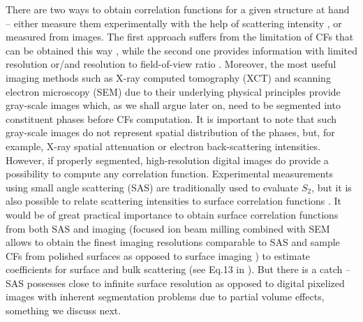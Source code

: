 \documentclass[reprint,amsmath,amssymb,aps,pre,showkeys,showpacs]{revtex4-1}
\begin{document}
There are two ways to obtain correlation functions for a given structure at hand
-- either measure them experimentally with the help of scattering intensity
\cite{debye1957scattering,li2018accurate}, or measured from images. The first
approach suffers from the limitation of CFs that can be obtained this way
\cite{Gommes_notchord}, while the second one provides information with limited
resolution or/and resolution to field-of-view ratio \cite{SciRep1}. Moreover,
the most useful imaging methods such as X-ray computed tomography (XCT) and
scanning electron microscopy (SEM) due to their underlying physical principles
provide gray-scale images which, as we shall argue later on, need to be
segmented into constituent phases before CFs computation. It is important to
note that such gray-scale images do not represent spatial distribution of the
phases, but, for example, X-ray spatial attenuation or electron back-scattering
intensities. However, if properly segmented, high-resolution digital images do
provide a possibility to compute any correlation function. Experimental
measurements using small angle scattering (SAS) are traditionally used to
evaluate $S_2$, but it is also possible to relate scattering intensities to
surface correlation functions \cite{dietrich1995scattering,ma2018SS}. It would
be of great practical importance to obtain surface correlation functions from
both SAS and imaging (focused ion beam milling combined with SEM allows to
obtain the finest imaging resolutions comparable to SAS and sample CFs from
polished surfaces as opposed to surface imaging \cite{FIB-SEMpaper}) to estimate
coefficients for surface and bulk scattering (see Eq.13 in \cite{ma2018SS}). But
there is a catch -- SAS possesses close to infinite surface resolution as
opposed to digital pixelized images with inherent segmentation problems due to
partial volume effects, something we discuss next.
\end{document}
